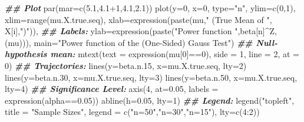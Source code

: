 \documentclass[
]{book}
\newenvironment{Shaded}{\begin{snugshade}}{\end{snugshade}}
\newcommand{\AttributeTok}[1]{\textcolor[rgb]{0.77,0.63,0.00}{#1}}
\newcommand{\DecValTok}[1]{\textcolor[rgb]{0.00,0.00,0.81}{#1}}
\newcommand{\DocumentationTok}[1]{\textcolor[rgb]{0.56,0.35,0.01}{\textbf{\textit{#1}}}}
\newcommand{\FloatTok}[1]{\textcolor[rgb]{0.00,0.00,0.81}{#1}}
\newcommand{\FunctionTok}[1]{\textcolor[rgb]{0.00,0.00,0.00}{#1}}
\newcommand{\NormalTok}[1]{#1}
\newcommand{\SpecialCharTok}[1]{\textcolor[rgb]{0.00,0.00,0.00}{#1}}
\newcommand{\StringTok}[1]{\textcolor[rgb]{0.31,0.60,0.02}{#1}}
\begin{document}
\begin{Shaded}
\begin{Highlighting}[]
\DocumentationTok{\#\# Plot}
\FunctionTok{par}\NormalTok{(}\AttributeTok{mar=}\FunctionTok{c}\NormalTok{(}\FloatTok{5.1}\NormalTok{,}\FloatTok{4.1}\SpecialCharTok{+}\DecValTok{1}\NormalTok{,}\FloatTok{4.1}\NormalTok{,}\FloatTok{2.1}\NormalTok{))}
\FunctionTok{plot}\NormalTok{(}\AttributeTok{y=}\DecValTok{0}\NormalTok{, }\AttributeTok{x=}\DecValTok{0}\NormalTok{, }\AttributeTok{type=}\StringTok{"n"}\NormalTok{,}
     \AttributeTok{ylim=}\FunctionTok{c}\NormalTok{(}\DecValTok{0}\NormalTok{,}\DecValTok{1}\NormalTok{),}
     \AttributeTok{xlim=}\FunctionTok{range}\NormalTok{(mu.X.true.seq), }
     \AttributeTok{xlab=}\FunctionTok{expression}\NormalTok{(}\FunctionTok{paste}\NormalTok{(mu,}\StringTok{" (True Mean of "}\NormalTok{, X[i],}\StringTok{")"}\NormalTok{)), }
     \DocumentationTok{\#\# Labels:}
     \AttributeTok{ylab=}\FunctionTok{expression}\NormalTok{(}\FunctionTok{paste}\NormalTok{(}\StringTok{"Power function "}\NormalTok{,beta[n]}\SpecialCharTok{\^{}}\NormalTok{Z,(mu))), }
     \AttributeTok{main=}\StringTok{"Power function of the (One{-}Sided) Gauss Test"}\NormalTok{)}
\DocumentationTok{\#\# Null{-}hypothesis mean:}
\FunctionTok{mtext}\NormalTok{(}\AttributeTok{text =} \FunctionTok{expression}\NormalTok{(mu[}\DecValTok{0}\NormalTok{]}\SpecialCharTok{==}\DecValTok{0}\NormalTok{), }\AttributeTok{side =} \DecValTok{1}\NormalTok{, }\AttributeTok{line =} \DecValTok{2}\NormalTok{, }\AttributeTok{at =} \DecValTok{0}\NormalTok{)}
\DocumentationTok{\#\# Trajectories:}
\FunctionTok{lines}\NormalTok{(}\AttributeTok{y=}\NormalTok{beta.n}\FloatTok{.15}\NormalTok{, }\AttributeTok{x=}\NormalTok{mu.X.true.seq, }\AttributeTok{lty=}\DecValTok{2}\NormalTok{)}
\FunctionTok{lines}\NormalTok{(}\AttributeTok{y=}\NormalTok{beta.n}\FloatTok{.30}\NormalTok{, }\AttributeTok{x=}\NormalTok{mu.X.true.seq, }\AttributeTok{lty=}\DecValTok{3}\NormalTok{)}
\FunctionTok{lines}\NormalTok{(}\AttributeTok{y=}\NormalTok{beta.n}\FloatTok{.50}\NormalTok{, }\AttributeTok{x=}\NormalTok{mu.X.true.seq, }\AttributeTok{lty=}\DecValTok{4}\NormalTok{)}
\DocumentationTok{\#\# Significance Level:}
\FunctionTok{axis}\NormalTok{(}\DecValTok{4}\NormalTok{, }\AttributeTok{at=}\FloatTok{0.05}\NormalTok{, }\AttributeTok{labels =} \FunctionTok{expression}\NormalTok{(alpha}\SpecialCharTok{==}\FloatTok{0.05}\NormalTok{))}
\FunctionTok{abline}\NormalTok{(}\AttributeTok{h=}\FloatTok{0.05}\NormalTok{, }\AttributeTok{lty=}\DecValTok{1}\NormalTok{)}
\DocumentationTok{\#\# Legend:}
\FunctionTok{legend}\NormalTok{(}\StringTok{"topleft"}\NormalTok{, }\AttributeTok{title =} \StringTok{"Sample Sizes"}\NormalTok{, }
       \AttributeTok{legend =} \FunctionTok{c}\NormalTok{(}\StringTok{"n=50"}\NormalTok{,}\StringTok{"n=30"}\NormalTok{,}\StringTok{"n=15"}\NormalTok{), }
       \AttributeTok{lty=}\FunctionTok{c}\NormalTok{(}\DecValTok{4}\SpecialCharTok{:}\DecValTok{2}\NormalTok{))}
\end{Highlighting}
\end{Shaded}
\end{document}
